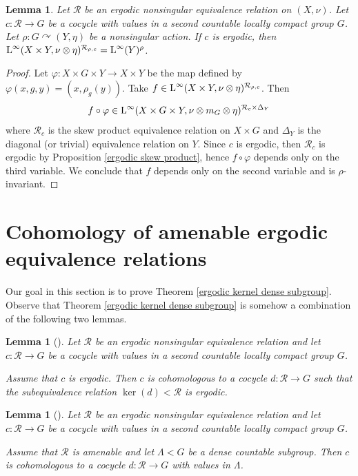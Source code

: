 \documentclass[a4paper,11pt]{amsart}
\numberwithin{equation}{section}
\newtheorem{lemma}[theorem]{Lemma}
\theoremstyle{definition}
\newcommand{\rL}{\mathord{\text{\rm L}}}
\newcommand{\cR}{\mathcal{R}}
\begin{document}
\begin{lemma} \label{dense range induced equivalence relation}
    Let $\cR$ be an ergodic nonsingular equivalence relation on $(X,\nu)$. Let $c : \cR \rightarrow G$ be a cocycle with values in a second countable locally compact group $G$. Let $\rho : G \curvearrowright (Y,\eta)$ be a nonsingular action. If $c$ is ergodic, then $\rL^\infty(X \times Y, \nu \otimes \eta)^{\cR_{\rho,c}} = \rL^\infty(Y)^{\rho}$.
\end{lemma}
\begin{proof}
    Let $\varphi : X \times G \times Y \rightarrow X \times Y$ be the map defined by $\varphi(x,g,y)=(x,\rho_g(y))$. Take $f \in \rL^\infty(X \times Y, \nu \otimes \eta)^{\cR_{\rho,c}}$. Then $$f \circ \varphi \in \rL^\infty(X \times G \times Y, \nu \otimes m_G \otimes \eta)^{\cR_{c} \times \Delta_Y}$$
    where $\cR_c$ is the skew product equivalence relation on $X \times G$ and $\Delta_Y$ is the diagonal (or trivial) equivalence relation on $Y$. Since $c$ is ergodic, then $\cR_c$ is ergodic by Proposition \ref{ergodic skew product}, hence $f \circ \varphi$ depends only on the third variable. We conclude that $f$ depends only on the second variable and is $\rho$-invariant.
\end{proof}




\section{Cohomology of amenable ergodic equivalence relations}

Our goal in this section is to prove Theorem \ref{ergodic kernel dense subgroup}. Observe that Theorem \ref{ergodic kernel dense subgroup} is somehow a combination of the following two lemmas.


\begin{lemma}[{\cite[Lemma 1.6]{GS91}}] \label{ergodic kernel}
Let $\cR$ be an ergodic nonsingular equivalence relation and let $c : \cR \rightarrow G$ be a cocycle with values in a second countable locally compact group $G$. 

Assume that $c$ is ergodic. Then $c$ is cohomologous to a cocycle $d : \cR \rightarrow G$ such that the subequivalence relation $\ker(d) < \cR$ is ergodic.
\end{lemma}

\begin{lemma}[{\cite[Proposition 1.2]{GS91}}] \label{dense subgroup}
Let $\cR$ be an ergodic nonsingular equivalence relation and let $c : \cR \rightarrow G$ be a cocycle with values in a second countable locally compact group $G$. 

Assume that $\cR$ is amenable and let $\Lambda < G$ be a dense countable subgroup. Then $c$ is cohomologous to a cocycle $d : \cR \rightarrow G$ with values in $\Lambda$.
\end{lemma}
\end{document}
